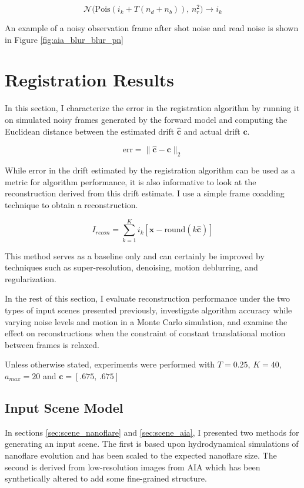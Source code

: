 \documentclass[tocnosub,noragright,centerchapter,12pt]{uiucecethesis09}
\begin{document}
$$\mathcal{N}\Big( \text{Pois}(i_k + T (n_d + n_b)), \, n_r^2\Big) \rightarrow i_k$$

An example of a noisy observation frame after shot noise and read noise is shown in Figure \ref{fig:aia_blur_blur_pn}

\section{Registration Results} \label{sec:results}

In this section, I characterize the error in the registration algorithm by running it on simulated noisy frames generated by the forward model and computing the Euclidean distance between the estimated drift $\bm{\hat{c}}$ and actual drift $\bm{c}$.

$$\text{err} = \lVert \hat{\bm{c}} - \bm{c} \rVert_2$$

While error in the drift estimated by the registration algorithm can be used as a metric for algorithm performance, it is also informative to look at the reconstruction derived from this drift estimate.  I use a simple frame coadding technique to obtain a reconstruction.

$$I_{recon} = \sum_{k=1}^K i_k\left[\bm{x} - \text{round}(k \hat{\bm{c}})\right]$$

This method serves as a baseline only and can certainly be improved by techniques such as super-resolution, denoising, motion deblurring, and regularization.

In the rest of this section, I evaluate reconstruction performance under the two types of input scenes presented previously, investigate algorithm accuracy while varying noise levels and motion in a Monte Carlo simulation, and examine the effect on reconstructions when the constraint of constant translational motion between frames is relaxed.

Unless otherwise stated, experiments were performed with $T=0.25$, $K=40$, $a_{max} = 20$ and $\bm{c} = [.675,\, .675]$


\subsection{Input Scene Model}

In sections \ref{sec:scene_nanoflare} and \ref{sec:scene_aia}, I presented two methods for generating an input scene.  The first is based upon hydrodynamical simulations of nanoflare evolution and has been scaled to the expected nanoflare size.  The second is derived from low-resolution images from AIA which has been synthetically altered to add some fine-grained structure.
\end{document}
